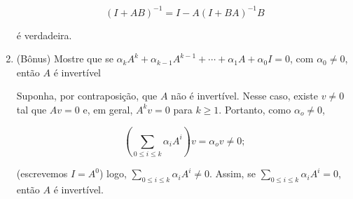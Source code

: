 \documentclass[leqno]{article}
\begin{document}
\begin{enumerate}
\begin{sol}
	\begin{equation*} 
		(I + AB)^{-1} = I - A(I + BA)^{-1}B   
	\end{equation*} 

	\noindent é verdadeira. 
\end{sol}

\item (Bônus) Mostre que se $\alpha_kA^k + \alpha_{k-1}A^{k-1} + \cdots + \alpha_1 A + \alpha_0 I = 0$, com $\alpha_0 \neq 0$, então $A$ é invertível

\begin{sol} 
	Suponha, por contraposição, que $A$ não é invertível. Nesse caso, existe $v \neq 0$ tal que $Av = 0$ e, em geral, $A^{k}v = 0$ para $k \ge 1$. Portanto, como $\alpha_{o} \neq 0$, 

	\begin{equation*} 
		\left(\sum_{0 \le i \le k} \alpha_{i}A^{i}\right)v = \alpha_{o}v \neq 0;  
	\end{equation*} 

	\noindent (escrevemos $I = A^{0}$) logo, $\sum_{0 \le i \le k} \alpha_{i}A^{i} \neq 0$. Assim, se $\sum_{0 \le i \le k} \alpha_{i} A^{i} = 0$, então $A$ é invertível.  
\end{sol} 
\end{enumerate}
\end{document}
